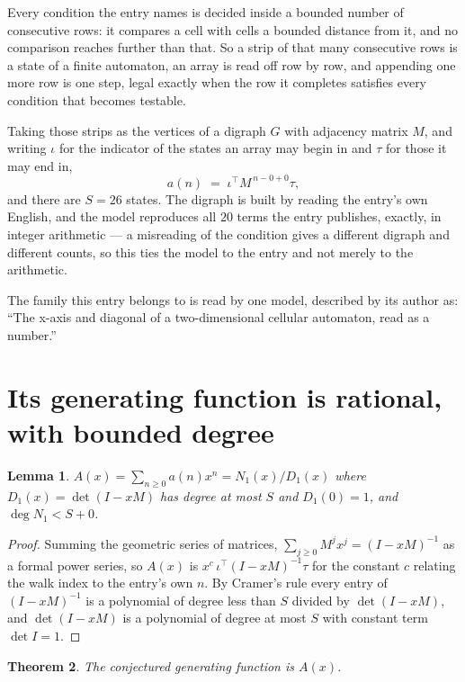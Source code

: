 \documentclass[11pt,a4paper]{article}
\theoremstyle{plain}
\newtheorem{theorem}{Theorem}
\newtheorem{lemma}[theorem]{Lemma}
\theoremstyle{definition}
\begin{document}
Every condition the entry names is decided inside a bounded number of consecutive rows: it
compares a cell with cells a bounded distance from it, and no comparison reaches further than
that. So a strip of that many consecutive rows is a state of a finite automaton, an array is
read off row by row, and appending one more row is one step, legal exactly when the row it
completes satisfies every condition that becomes testable.

Taking those strips as the vertices of a digraph $G$ with adjacency matrix $M$, and writing
$\iota$ for the indicator of the states an array may begin in and $\tau$ for those it may end
in,
\[
a(n)\;=\;\iota^{\!\top}M^{\,n-0+0}\tau ,
\]
and there are $S=26$ states. The digraph is built by reading the entry's own English, and the
model reproduces all $20$ terms the entry publishes, exactly, in integer arithmetic --- a
misreading of the condition gives a different digraph and different counts, so this ties the
model to the entry and not merely to the arithmetic.

The family this entry belongs to is read by one model, described by its author as: ``The x-axis and diagonal of a two-dimensional cellular automaton, read as a number.''


\section{Its generating function is rational, with bounded degree}

\begin{lemma}\label{lem:rat}
$A(x)=\sum_{n\ge0}a(n)x^n=N_1(x)/D_1(x)$ where $D_1(x)=\det(I-xM)$ has degree at most
$S$ and $D_1(0)=1$, and $\deg N_1<S+0$.
\end{lemma}

\begin{proof}
Summing the geometric series of matrices, $\sum_{j\ge0}M^jx^j=(I-xM)^{-1}$ as a formal
power series, so $A(x)$ is $x^{c}\,\iota^{\!\top}(I-xM)^{-1}\tau$ for the constant $c$
relating the walk index to the entry's own $n$. By Cramer's rule every entry of
$(I-xM)^{-1}$ is a polynomial of degree less than $S$ divided by $\det(I-xM)$, and
$\det(I-xM)$ is a polynomial of degree at most $S$ with constant term $\det I=1$.
\end{proof}

\begin{theorem}
The conjectured generating function is $A(x)$.
\end{theorem}
\end{document}
